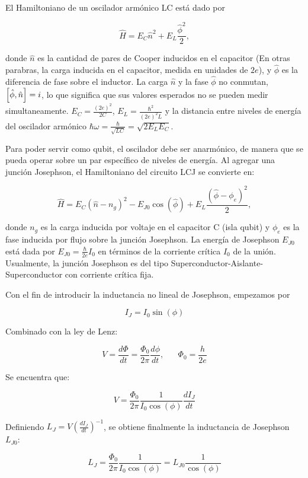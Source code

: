 El Hamiltoniano de un oscilador armónico LC está dado por 

\begin{equation}
\hat{H} = E_C \hat{n}^2 + E_L \frac{\hat{\phi}^2}{2},
\end{equation}

donde $\hat{n}$ es la cantidad de pares de Cooper inducidos en el capacitor (En otras parabras, la carga inducida en el capacitor, medida en unidades de $2e$), y $\hat{\phi}$ es la diferencia de fase sobre el inductor. La carga $\hat{n}$ y la fase $\hat{\phi}$ no conmutan, $\comm{\hat{\phi}}{\hat{n}}=i$, lo que significa que sus valores esperados no se pueden medir simultaneamente. $E_C=\frac{(2e)^2}{2C}$, $E_L=\frac{\hbar^2}{(2e)^2L}$ y la distancia entre niveles de energía del oscilador armónico $\hbar \omega = \frac{\hbar}{\sqrt{LC}}=\sqrt{2E_LE_C}$.

Para poder servir como qubit, el oscilador debe ser anarmónico, de manera que se pueda operar sobre un par específico de niveles de energía. Al agregar una junción Josephson, el Hamiltoniano del circuito LCJ se convierte en:

\[
\hat{H} = E_C (\hat{n}-n_g)^2 - E_{J0} \cos( \hat{\phi} ) + E_L \frac{(\hat{\phi}-\phi_e)^2}{2},
\]

donde $n_g$ es la carga inducida por voltaje en el capacitor C (isla qubit) y $\phi_e$ es la fase inducida por flujo sobre la junción Josephson. La energía de Josephson $E_{J0}$ está dada por $E_{J0}=\frac{\hbar}{2e}I_0$ en términos de la corriente crítica $I_0$ de la unión. Usualmente, la junción Josephson es del tipo Superconductor-Aislante-Superconductor con corriente crítica fija.

Con el fin de introducir la inductancia no lineal de Josephson, empezamos por 

\[
I_J = I_0 \sin(\phi)
\]

Combinado con la ley de Lenz:

\[
V = \frac{d\Phi}{dt} = \frac{\Phi_0}{2\pi} \frac{d\phi}{dt}, \hspace{20pt} \Phi_0=\frac{h}{2e}
\]

Se encuentra que:

\[
V = \frac{\Phi_0}{2\pi} \frac{1}{I_0\cos(\phi)} \frac{dI_J}{dt}
\]

Definiendo $L_J = V (\frac{dI_J}{dt})^{-1}$, se obtiene finalmente la inductancia de Josephson $L_{J0}$:

\[
L_J = \frac{\Phi_0}{2\pi} \frac{1}{I_0 \cos(\phi)} = L_{J0} \frac{1}{\cos(\phi)}
\]

